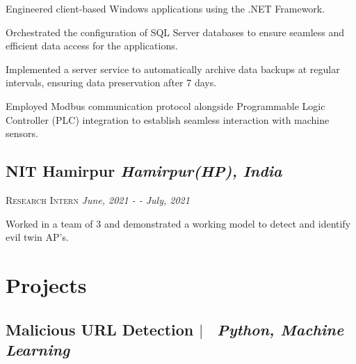 \documentclass[10pt]{article}
\begin{document}
\begin{description}
\setlength{\itemindent}{2\parindent}
\setlength{\itemsep}{0em}
\item[$\bullet$]{Engineered client-based Windows applications using the .NET Framework.}
\item[$\bullet$]{Orchestrated the configuration of SQL Server databases to ensure seamless and efficient data access for the applications.}
\item[$\bullet$]{Implemented a server service to automatically archive data backups at regular intervals, ensuring data preservation after 7 days.}
\item[$\bullet$]{Employed Modbus communication protocol alongside Programmable Logic Controller (PLC) integration to establish seamless interaction with machine sensors.}
\end{description}


\subsection*{NIT Hamirpur \hfill \normalsize \normalfont \textit{Hamirpur(HP), India}}
\vspace{-1ex}
\textsc{\textmd{Research Intern}} \hfill \normalsize \textit{June, 2021 - - July, 2021}
\vspace{-1ex}

\begin{description}
\setlength{\itemindent}{2\parindent}
\setlength{\itemsep}{0em}
\item[$\bullet$]{Worked in a team of 3 and demonstrated a working model to detect and identify evil twin AP's.}
\end{description}


\section{Projects}

\subsection*{
  Malicious URL Detection
  $|$
  \normalsize \normalfont \ \textit{Python, Machine Learning}
  \hfill 
}
\end{document}

